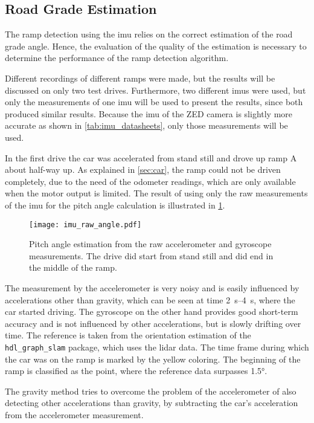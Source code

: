 \subsection{Road Grade Estimation}
The ramp detection using the \gls{imu} relies on the correct estimation of the road grade angle.
Hence, the evaluation of the quality of the estimation is necessary to determine the performance of the ramp detection algorithm.\par
Different recordings of different ramps were made, but the results will be discussed on only two test drives.
Furthermore, two different \glspl{imu} were used, but only the measurements of one \gls{imu} will be used to present the results, since both produced similar results.
Because the \gls{imu} of the ZED camera is slightly more accurate as shown in \cref{tab:imu_datasheets}, only those measurements will be used.\par
In the first drive the car was accelerated from stand still and drove up ramp A about half-way up.
As explained in \cref{sec:car}, the ramp could not be driven completely, due to the need of the odometer readings, which are only available when the motor output is limited.
The result of using only the raw measurements of the \gls{imu} for the pitch angle calculation is illustrated in \cref{fig:imu_raw_angle}.
\begin{figure}[htb]
    \centering
    \texttt{[image: imu\_raw\_angle.pdf]}
    \caption[Angle estimation using raw measurements]{Pitch angle estimation from the raw accelerometer and gyroscope measurements. The drive did start from stand still and did end in the middle of the ramp.}
    \label{fig:imu_raw_angle}
\end{figure}
The measurement by the accelerometer is very noisy and is easily influenced by accelerations other than gravity, which can be seen at time \SIrange{2}{4}{\second}, where the car started driving.
The gyroscope on the other hand provides good short-term accuracy and is not influenced by other accelerations, but is slowly drifting over time.
The reference is taken from the orientation estimation of the \texttt{hdl\_graph\_slam} package, which uses the \gls{lidar} data.
The time frame during which the car was on the ramp is marked by the yellow coloring.
The beginning of the ramp is classified as the point, where the reference data surpasses \ang{1.5}.\par
The gravity method tries to overcome the problem of the accelerometer of also detecting other accelerations than gravity, by subtracting the car's acceleration from the accelerometer measurement.
